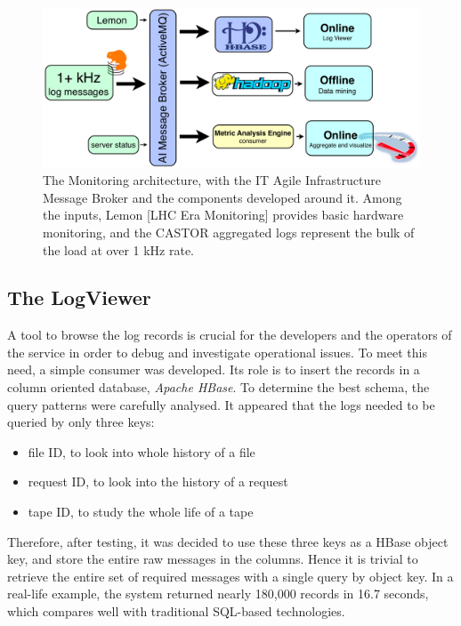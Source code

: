 \begin{figure}[h]
\begin{center}
\includegraphics[width=32pc]{monitoring_architecture.png}
\caption{\label{fig:arch}The Monitoring architecture, with the IT Agile Infrastructure Message Broker and the components developed around it.
Among the inputs, Lemon [LHC Era Monitoring] provides basic hardware monitoring, and the CASTOR aggregated logs represent the bulk of the load at over 1 kHz rate.}
\end{center}
\end{figure}


\subsection{The LogViewer}

A tool to browse the log records is crucial for the developers and the operators of the service in order to debug and investigate operational issues. To meet this need, a simple consumer was developed. Its role is to insert the records in a column oriented database, \textit{Apache HBase}.
To determine the best schema, the query patterns were carefully analysed. It appeared that the logs needed to be queried by only three keys:
\begin{itemize}
\item file ID, to look into whole history of a file
\item request ID, to look into the history of a request
\item tape ID, to study the whole life of a tape
\end{itemize}
Therefore, after testing, it was decided to use these three keys as a HBase object key, and store the entire raw messages in the columns. Hence it is trivial to retrieve the entire set of required messages with a single query by object key. In a real-life example, the system returned nearly 180,000 records in 16.7 seconds, which compares well with traditional SQL-based technologies.

